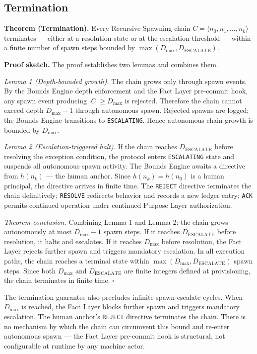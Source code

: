 \subsection{Termination}
\label{sec:rs-termination}

\medskip
\noindent\textbf{Theorem (Termination).} Every Recursive Spawning chain $C = \langle n_0, n_1, \ldots, n_k \rangle$ terminates — either at a resolution state or at the escalation threshold — within a finite number of spawn steps bounded by $\max(D_{\mathrm{max}}, D_{\mathrm{ESCALATE}})$.

\medskip
\noindent\textbf{Proof sketch.} The proof establishes two lemmas and combines them.

\medskip
\textit{Lemma 1 (Depth-bounded growth).} The chain grows only through spawn events. By the Bounds Engine depth enforcement and the Fact Layer pre-commit hook, any spawn event producing $|C| \geq D_{\mathrm{max}}$ is rejected. Therefore the chain cannot exceed depth $D_{\mathrm{max}} - 1$ through autonomous spawn. Rejected spawns are logged; the Bounds Engine transitions to \texttt{ESCALATING}. Hence autonomous chain growth is bounded by $D_{\mathrm{max}}$.

\medskip
\textit{Lemma 2 (Escalation-triggered halt).} If the chain reaches $D_{\mathrm{ESCALATE}}$ before resolving the exception condition, the protocol enters \texttt{ESCALATING} state and suspends all autonomous spawn activity. The Bounds Engine awaits a directive from $h(n_k)$ — the human anchor. Since $h(n_k) = h(n_0)$ is a human principal, the directive arrives in finite time. The \texttt{REJECT} directive terminates the chain definitively; \texttt{RESOLVE} redirects behavior and records a new ledger entry; \texttt{ACK} permits continued operation under continued Purpose Layer authorization.

\medskip
\textit{Theorem conclusion.} Combining Lemma 1 and Lemma 2: the chain grows autonomously at most $D_{\mathrm{max}} - 1$ spawn steps. If it reaches $D_{\mathrm{ESCALATE}}$ before resolution, it halts and escalates. If it reaches $D_{\mathrm{max}}$ before resolution, the Fact Layer rejects further spawn and triggers mandatory escalation. In all execution paths, the chain reaches a terminal state within $\max(D_{\mathrm{max}}, D_{\mathrm{ESCALATE}})$ spawn steps. Since both $D_{\mathrm{max}}$ and $D_{\mathrm{ESCALATE}}$ are finite integers defined at provisioning, the chain terminates in finite time. $\square$

The termination guarantee also precludes infinite spawn-escalate cycles. When $D_{\mathrm{max}}$ is reached, the Fact Layer blocks further spawn and triggers mandatory escalation. The human anchor's \texttt{REJECT} directive terminates the chain. There is no mechanism by which the chain can circumvent this bound and re-enter autonomous spawn — the Fact Layer pre-commit hook is structural, not configurable at runtime by any machine actor.

